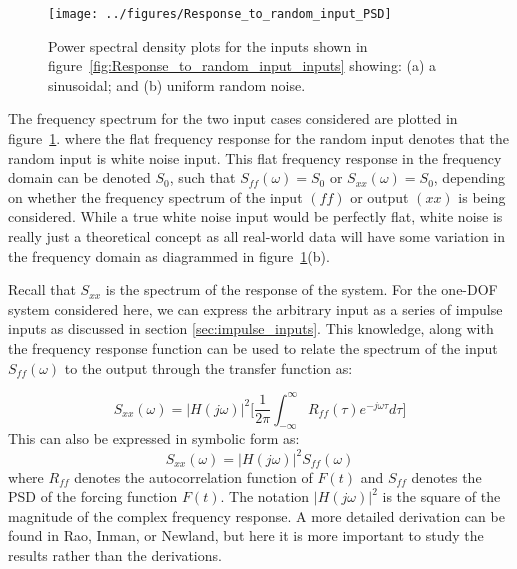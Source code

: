 \documentclass[12pt,letter]{article}
\begin{document}
\begin{figure}[H]
	\centering
	\texttt{[image: ../figures/Response\_to\_random\_input\_PSD]}
	\caption{Power spectral density plots for the inputs shown in figure~\ref{fig:Response_to_random_input_inputs} showing: (a) a sinusoidal; and (b) uniform random noise.}
	\label{fig:Response_to_random_input_PSD}
\end{figure}

The frequency spectrum for the two input cases considered are plotted in figure~\ref{fig:Response_to_random_input_PSD}. where the flat frequency response for the random input denotes that the random input is white noise input.  This flat frequency response in the frequency domain can be denoted $S_0$, such that $S_{ff}(\omega) = S_0$ or $S_{xx}(\omega) = S_0$, depending on whether the frequency spectrum of the input $(ff)$ or output  $(xx)$ is being considered. While a true white noise input would be perfectly flat, white noise is really just a theoretical concept as all real-world data will have some variation in the frequency domain as diagrammed in figure~\ref{fig:Response_to_random_input_PSD}(b). 


Recall that $S_{xx}$ is the spectrum of the response of the system. For the one-DOF system considered here, we can express the arbitrary input as a series of impulse inputs as discussed in section \ref{sec:impulse_inputs}. This knowledge, along with the frequency response function can be used to relate the spectrum of the input $S_{ff}(\omega)$ to the output through the transfer function as: 







\begin{equation}
S_{xx}(\omega) =  |H(j\omega)|^2\Bigg[\frac{1}{2 \pi } \int_{-\infty}^{\infty} R_{ff}(\tau) e^{-j \omega \tau}d  \tau  \Bigg] 
\end{equation}
This can also be expressed in symbolic form as:
\begin{equation}
S_{xx}(\omega) =  |H(j\omega)|^2 S_{ff}(\omega)
\end{equation}
where $R_{ff}$ denotes the autocorrelation function of $F(t)$ and $S_{ff}$ denotes the PSD of the forcing function $F(t)$. The notation $|H(j\omega)|^2$ is the square of the magnitude of the complex frequency response. A more detailed derivation can be found in Rao\protect\footnotemark[1], Inman\protect\footnotemark[2], or Newland\protect\footnotemark[3], but here it is more important to study the results rather than the derivations.
\end{document}
